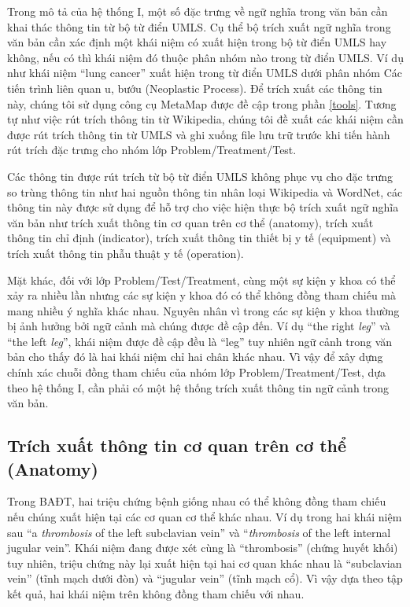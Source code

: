 Trong mô tả của hệ thống I, một số đặc trưng về ngữ nghĩa trong văn bản cần khai thác thông tin từ bộ từ điển UMLS. Cụ thể bộ trích xuất ngữ nghĩa trong văn bản cần xác định một khái niệm có xuất hiện trong bộ từ điển UMLS hay không, nếu có thì khái niệm đó thuộc phân nhóm nào trong từ điển UMLS. Ví dụ như khái niệm ``lung cancer'' xuất hiện trong từ điển UMLS dưới phân nhóm Các tiến trình liên quan u, bướu (Neoplastic Process). Để trích xuất các thông tin này, chúng tôi sử dụng công cụ MetaMap được đề cập trong phần \ref{tools}. Tương tự như việc rút trích thông tin từ Wikipedia, chúng tôi đề xuất các khái niệm cần được rút trích thông tin từ UMLS và ghi xuống file lưu trữ trước khi tiến hành rút trích đặc trưng cho nhóm lớp Problem/Treatment/Test.

Các thông tin được rút trích từ bộ từ điển UMLS không phục vụ cho đặc trưng so trùng thông tin như hai nguồn thông tin nhân loại Wikipedia và WordNet, các thông tin này được sử dụng để hỗ trợ cho việc hiện thực bộ trích xuất ngữ nghĩa văn bản như trích xuất thông tin cơ quan trên cơ thể (anatomy), trích xuất thông tin chỉ định (indicator), trích xuất thông tin thiết bị y tế (equipment) và trích xuất thông tin phẫu thuật y tế (operation).

Mặt khác, đối với lớp Problem/Test/Treatment, cùng một sự kiện y khoa có thể xảy ra nhiều lần nhưng các sự kiện y khoa đó có thể không đồng tham chiếu mà mang nhiều ý nghĩa khác nhau. Nguyên nhân vì trong các sự kiện y khoa thường bị ảnh hưởng bởi ngữ cảnh mà chúng được đề cập đến. Ví dụ ``the right \textit{leg}'' và ``the left \textit{leg}'', khái niệm được đề cập đều là ``leg'' tuy nhiên ngữ cảnh trong văn bản cho thấy đó là hai khái niệm chỉ hai chân khác nhau. Vì vậy để xây dựng chính xác chuỗi đồng tham chiếu của nhóm lớp Problem/Treatment/Test, dựa theo hệ thống I, cần phải có một hệ thống trích xuất thông tin ngữ cảnh trong văn bản.

\subsection*{Trích xuất thông tin cơ quan trên cơ thể (Anatomy)}
Trong BAĐT, hai triệu chứng bệnh giống nhau có thể không đồng tham chiếu nếu chúng xuất hiện tại các cơ quan cơ thể khác nhau. Ví dụ trong hai khái niệm sau ``a \textit{thrombosis} of the left subclavian vein'' và ``\textit{thrombosis} of the left internal jugular vein''. Khái niệm đang được xét cùng là ``thrombosis'' (chứng huyết khối) tuy nhiên, triệu chứng này lại xuất hiện tại hai cơ quan khác nhau là ``subclavian vein'' (tĩnh mạch dưới đòn) và ``jugular vein'' (tĩnh mạch cổ). Vì vậy dựa theo tập kết quả, hai khái niệm trên không đồng tham chiếu với nhau.


